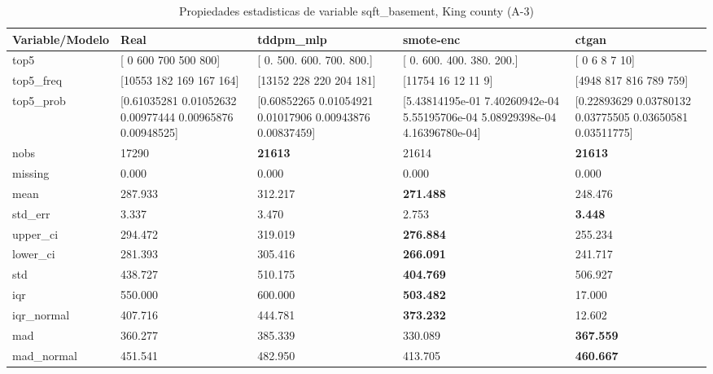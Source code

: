 \begin{table}[H]
\centering
\fontsize{8}{14}\selectfont
\caption{Propiedades  estadisticas de variable sqft\_basement, King county (A-3)}
\label{table-stats-king county-a-3-sqft_basement}
\begin{tabular}{|l|m{10em}|m{10em}|m{10em}|m{10em}|}
\hline
 \rowcolor[gray]{0.8}
Variable/Modelo & Real & tddpm\_mlp & smote-enc & ctgan \\
\hline top5 & [  0 600 700 500 800] & [  0. 500. 600. 700. 800.] & [  0. 600. 400. 380. 200.] & [ 0  6  8  7 10] \\
\hline top5\_freq & [10553   182   169   167   164] & [13152   228   220   204   181] & [11754    16    12    11     9] & [4948  817  816  789  759] \\
\hline top5\_prob & [0.61035281 0.01052632 0.00977444 0.00965876 0.00948525] & [0.60852265 0.01054921 0.01017906 0.00943876 0.00837459] & [5.43814195e-01 7.40260942e-04 5.55195706e-04 5.08929398e-04
 4.16396780e-04] & [0.22893629 0.03780132 0.03775505 0.03650581 0.03511775] \\
\hline nobs & 17290 & \bfseries 21613 & \cellcolor[rgb]{0.9, 0.54, 0.52} 21614 & \bfseries 21613 \\
\hline missing & 0.000 & 0.000 & 0.000 & 0.000 \\
\hline mean & 287.933 & 312.217 & \bfseries 271.488 & \cellcolor[rgb]{0.9, 0.54, 0.52} 248.476 \\
\hline std\_err & 3.337 & 3.470 & \cellcolor[rgb]{0.9, 0.54, 0.52} 2.753 & \bfseries 3.448 \\
\hline upper\_ci & 294.472 & 319.019 & \bfseries 276.884 & \cellcolor[rgb]{0.9, 0.54, 0.52} 255.234 \\
\hline lower\_ci & 281.393 & 305.416 & \bfseries 266.091 & \cellcolor[rgb]{0.9, 0.54, 0.52} 241.717 \\
\hline std & 438.727 & \cellcolor[rgb]{0.9, 0.54, 0.52} 510.175 & \bfseries 404.769 & 506.927 \\
\hline iqr & 550.000 & 600.000 & \bfseries 503.482 & \cellcolor[rgb]{0.9, 0.54, 0.52} 17.000 \\
\hline iqr\_normal & 407.716 & 444.781 & \bfseries 373.232 & \cellcolor[rgb]{0.9, 0.54, 0.52} 12.602 \\
\hline mad & 360.277 & 385.339 & \cellcolor[rgb]{0.9, 0.54, 0.52} 330.089 & \bfseries 367.559 \\
\hline mad\_normal & 451.541 & 482.950 & \cellcolor[rgb]{0.9, 0.54, 0.52} 413.705 & \bfseries 460.667 \\

\end{tabular}
\end{table}
